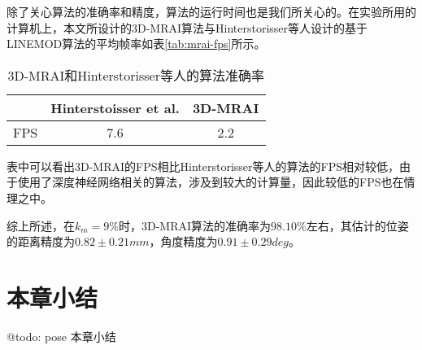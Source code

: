 除了关心算法的准确率和精度，算法的运行时间也是我们所关心的。在实验所用的计算机上，本文所设计的3D-MRAI算法与Hinterstorisser等人设计的基于LINEMOD算法的平均帧率如表\ref{tab:mrai-fps}所示。
\begin{table}[ht]
  \centering
  \begin{tabular}{ccc}
    \toprule
    &Hinterstoisser et al.&\bf{3D-MRAI}\\
    \midrule
    FPS&7.6&2.2\\
    \bottomrule
  \end{tabular}
  \caption{3D-MRAI和Hinterstorisser等人的算法准确率}
  \label{tab:mrai}
\end{table}
表中可以看出3D-MRAI的FPS相比Hinterstorisser等人的算法的FPS相对较低，由于使用了深度神经网络相关的算法，涉及到较大的计算量，因此较低的FPS也在情理之中。

综上所述，在$k_m=9\%$时，3D-MRAI算法的准确率为$98.10\%$左右，其估计的位姿的距离精度为$0.82\pm0.21mm$，角度精度为$0.91\pm0.29deg$。

\section{本章小结}
@todo: pose 本章小结

